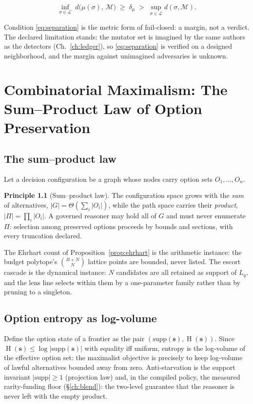 \documentclass[12pt,oneside]{report}
\theoremstyle{plain}
\theoremstyle{definition}
\newtheorem{principle}[theorem]{Principle}
\theoremstyle{remark}
\newcommand{\Ent}{\operatorname{H}}
\newcommand{\escort}[1]{L_{#1}}
\newcommand{\shares}{\mathbf{s}}
\begin{document}
\begin{equation}
\inf_{\sigma\in\mathcal{L}}\; d\bigl(\mu(\sigma),\,\mathcal{M}\bigr)
\;\ge\; \delta_\mu \;>\; \sup_{\sigma\in\mathcal{L}}
d(\sigma,\mathcal{M}) .
\label{eq:separation}
\end{equation}

Condition \eqref{eq:separation} is the metric form of fail-closed: a
margin, not a verdict. The declared limitation stands: the mutator set
is imagined by the same authors as the detectors
(Ch.~\ref{ch:ledger}), so \eqref{eq:separation} is verified on a
designed neighborhood, and the margin against unimagined adversaries is
unknown.

\chapter{Combinatorial Maximalism: The Sum--Product Law of Option Preservation}
\label{ch:dfcm}

\section{The sum--product law}

Let a decision configuration be a graph whose nodes carry option sets
$O_1,\dots,O_n$.

\begin{principle}[Sum--product law]
The configuration space grows with the \emph{sum} of alternatives,
$|G|=\Theta(\sum_i|O_i|)$, while the path space carries their
\emph{product}, $|\Pi|=\prod_i|O_i|$. A governed reasoner may hold all
of $G$ and must never enumerate $\Pi$: selection among preserved
options proceeds by bounds and sections, with every truncation
declared.
\end{principle}

The Ehrhart count of Proposition~\ref{prop:ehrhart} is the arithmetic
instance: the budget polytope's $\binom{B+N}{N}$ lattice points are
bounded, never listed. The escort cascade is the dynamical instance:
$N$ candidates are all retained as support of $\escort{q}$, and the
lens line selects within them by a one-parameter family rather than by
pruning to a singleton.

\section{Option entropy as log-volume}

Define the option state of a frontier as the pair
$(\mathrm{supp}(\shares), \Ent(\shares))$. Since
$\Ent(\shares)\le\log|\mathrm{supp}(\shares)|$ with equality iff
uniform, entropy is the log-volume of the effective option set: the
maximalist objective is precisely to keep log-volume of lawful
alternatives bounded away from zero. Anti-starvation is the support
invariant $|\mathrm{supp}|\ge1$ (projection law) and, in the compiled
policy, the measured rarity-funding floor (\S\ref{ch:blend}): the
two-level guarantee that the reasoner is never left with the empty
product.
\end{document}
